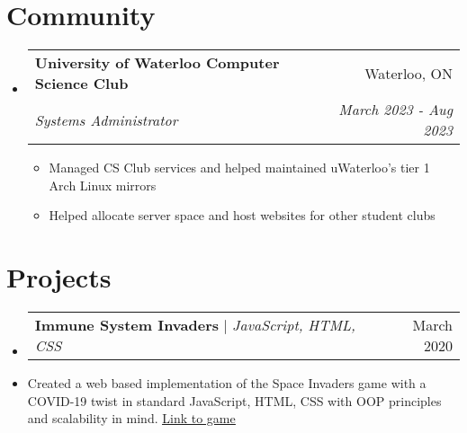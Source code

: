 \documentclass[letterpaper,11pt]{article}
\makeatletter
\newcommand{\resumeItem}[1]{
  \item\small{
    {#1 \vspace{-2pt}}
  }
}
\newcommand{\resumeSubheading}[4]{
  \vspace{-2pt}\item
    \begin{tabular*}{0.97\textwidth}[t]{l@{\extracolsep{\fill}}r}
      \textbf{#1} & #2 \\
      \textit{\small#3} & \textit{\small #4} \\
    \end{tabular*}\vspace{-7pt}
}
\newcommand{\resumeProjectHeading}[2]{
    \item
    \begin{tabular*}{0.97\textwidth}{l@{\extracolsep{\fill}}r}
      \small#1 & #2 \\
    \end{tabular*}\vspace{-7pt}
}
\newcommand{\resumeSubHeadingListStart}{\begin{itemize}[leftmargin=0.15in, label={}]}
\newcommand{\resumeSubHeadingListEnd}{\end{itemize}}
\newcommand{\resumeItemListStart}{\begin{itemize}}
\newcommand{\resumeItemListEnd}{\end{itemize}\vspace{-5pt}}
\makeatother
\begin{document}

\section{Community}
    \resumeSubHeadingListStart

    \resumeSubheading
      {University of Waterloo Computer Science Club}{Waterloo, ON}
      {Systems Administrator} {March 2023 - Aug 2023}
      \resumeItemListStart
        \resumeItem{Managed CS Club services and helped maintained uWaterloo's tier 1 Arch Linux mirrors}
        \resumeItem{Helped allocate server space and host websites for other student clubs}
      \resumeItemListEnd
    
    \resumeSubHeadingListEnd



    
\section{Projects}
    \resumeSubHeadingListStart
    \resumeProjectHeading
          {\textbf{Immune System Invaders} $|$ \emph{JavaScript, HTML, CSS}}{March 2020}
          \item
          Created a web based implementation of the Space Invaders game with a COVID-19 twist in standard JavaScript, HTML, CSS with OOP principles and scalability in mind.
      \href{https://jiafengyu.github.io/ISI/game.html}{\underline{Link to game}}
    \resumeSubHeadingListEnd

%
\end{document}
